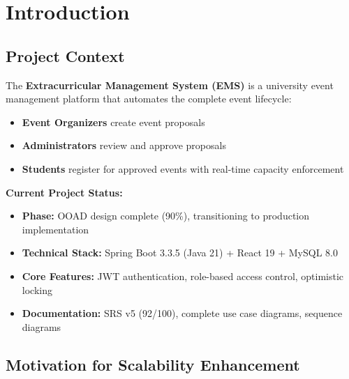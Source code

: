 \documentclass[12pt,a4paper,oneside]{report}
\begin{document}
\clearpage


\tableofcontents

\clearpage


\chapter{Introduction}

\section{Project Context}

The \textbf{Extracurricular Management System (EMS)} is a university event management platform that automates the complete event lifecycle:

\begin{itemize}[leftmargin=1.5em,topsep=0.3em,itemsep=0.2em]
    \item \textbf{Event Organizers} create event proposals
    \item \textbf{Administrators} review and approve proposals
    \item \textbf{Students} register for approved events with real-time capacity enforcement
\end{itemize}

\textbf{Current Project Status:}
\begin{itemize}[leftmargin=1.5em,topsep=0.3em,itemsep=0.2em]
    \item \textbf{Phase:} OOAD design complete (90\%), transitioning to production implementation
    \item \textbf{Technical Stack:} Spring Boot 3.3.5 (Java 21) + React 19 + MySQL 8.0
    \item \textbf{Core Features:} JWT authentication, role-based access control, optimistic locking
    \item \textbf{Documentation:} SRS v5 (92/100), complete use case diagrams, sequence diagrams
\end{itemize}

\section{Motivation for Scalability Enhancement}
\end{document}
